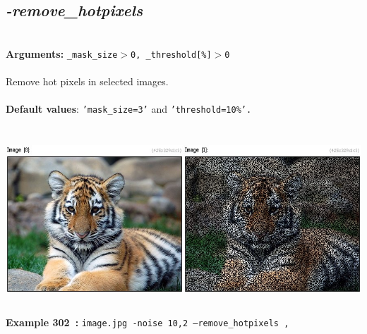 \documentclass[a4paper,11pt,twoside]{book}
\begin{document}
\subsection{\emph{-remove\_hotpixels} }\vspace*{-0.5em}
~\\\textbf{Arguments: } 
{\small \texttt{\_mask\_size$>$0, \_threshold[\%]$>$0}}\\~\\
Remove hot pixels in selected images.
~\\~\\\textbf{Default values}: {\small \texttt{'mask\_size=3'} and \texttt{'threshold=10\%'.}}
\begin{center}\includegraphics[keepaspectratio=true,height=7cm,width=\textwidth]{img/gmic_def302.jpg}\\
{\footnotesize \textbf{Example 302~:} \texttt{image.jpg -noise 10,2 --remove\_hotpixels ,}}
\end{center}
\end{document}
